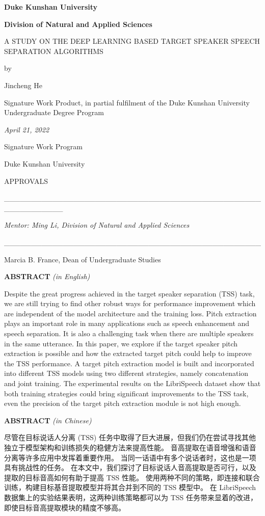 \documentclass[
]{article}
\author{}
\date{}
\begin{document}
    \textbf{Duke Kunshan University}

    \textbf{Division of Natural and Applied Sciences}

    A STUDY ON THE DEEP LEARNING BASED TARGET SPEAKER SPEECH SEPARATION ALGORITHMS

    by

    Jincheng He

    Signature Work Product, in partial fulfilment of the Duke Kunshan
    University Undergraduate Degree Program

    \emph{April 21, 2022}

    Signature Work Program

    Duke Kunshan University

    APPROVALS

    \_\_\_\_\_\_\_\_\_\_\_\_\_\_\_\_\_\_\_\_\_\_\_\_\_\_\_\_\_\_\_\_\_\_\_\_\_\_\_\_\_\_\_\_\_\_\_\_\_\_\_\_\_\_\_\_\_\_\_

    \emph{Mentor: Ming Li, Division of Natural and Applied Sciences}

    \_\_\_\_\_\_\_\_\_\_\_\_\_\_\_\_\_\_\_\_\_\_\_\_\_\_\_\_\_\_\_\_\_\_\_\_\_\_\_\_\_\_\_\_\_\_\_\_

    Marcia B. France, Dean of Undergraduate Studies

    \textbf{ABSTRACT} \emph{(in English)}

    Despite the great progress achieved in the target speaker separation (TSS) task, we are still trying to find other robust ways for performance improvement which are independent of the model architecture and the training loss.
    Pitch extraction plays an important role in many applications such as speech enhancement and speech separation.
    It is also a challenging task when there are multiple speakers in the same utterance.
    In this paper, we explore if the target speaker pitch extraction is possible and how the extracted target pitch could help to improve the TSS performance.
    A target pitch extraction model is built and incorporated into different TSS models using two different strategies, namely concatenation and joint training.
    The experimental results on the LibriSpeech dataset show that both training strategies could bring significant improvements to the TSS task, even the precision of the target pitch extraction module is not high enough.

    \textbf{ABSTRACT} \emph{(in Chinese)}

    \begin{CJK}{UTF8}{gbsn}
        尽管在目标说话人分离 (TSS) 任务中取得了巨大进展，但我们仍在尝试寻找其他独立于模型架构和训练损失的稳健方法来提高性能。
        音高提取在语音增强和语音分离等许多应用中发挥着重要作用。
        当同一话语中有多个说话者时，这也是一项具有挑战性的任务。
        在本文中，我们探讨了目标说话人音高提取是否可行，以及提取的目标音高如何有助于提高 TSS 性能。
        使用两种不同的策略，即连接和联合训练，构建目标基音提取模型并将其合并到不同的 TSS 模型中。
        在 LibriSpeech 数据集上的实验结果表明，这两种训练策略都可以为 TSS 任务带来显着的改进，即使目标音高提取模块的精度不够高。
    \end{CJK}
\end{document}
